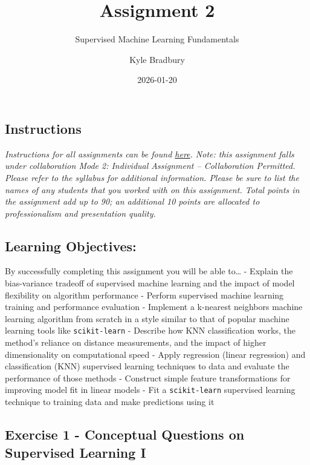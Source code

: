 \documentclass[
  letterpaper,
  DIV=11,
  numbers=noendperiod]{scrartcl}
\title{Assignment 2}
\subtitle{Supervised Machine Learning Fundamentals}
\author{Kyle Bradbury}
\date{2026-01-20}
\renewcommand*\contentsname{Table of contents}
\newcommand\contentsname{Table of contents}
\begin{document}
\maketitle

\renewcommand*\contentsname{Table of contents}
{
\hypersetup{linkcolor=}
\setcounter{tocdepth}{1}
\tableofcontents
}

\subsection{Instructions}\label{instructions}

\emph{Instructions for all assignments can be found
\href{https://kylebradbury.github.io/ids705/notebooks/assignment_instructions.html}{here}.
Note: this assignment falls under collaboration Mode 2: Individual
Assignment -- Collaboration Permitted. Please refer to the syllabus for
additional information. Please be sure to list the names of any students
that you worked with on this assignment. Total points in the assignment
add up to 90; an additional 10 points are allocated to professionalism
and presentation quality.}

\subsection{Learning Objectives:}\label{learning-objectives}

By successfully completing this assignment you will be able to\ldots{} -
Explain the bias-variance tradeoff of supervised machine learning and
the impact of model flexibility on algorithm performance - Perform
supervised machine learning training and performance evaluation -
Implement a k-nearest neighbors machine learning algorithm from scratch
in a style similar to that of popular machine learning tools like
\texttt{scikit-learn} - Describe how KNN classification works, the
method's reliance on distance measurements, and the impact of higher
dimensionality on computational speed - Apply regression (linear
regression) and classification (KNN) supervised learning techniques to
data and evaluate the performance of those methods - Construct simple
feature transformations for improving model fit in linear models - Fit a
\texttt{scikit-learn} supervised learning technique to training data and
make predictions using it

\subsection{Exercise 1 - Conceptual Questions on Supervised Learning
I}\label{exercise-1---conceptual-questions-on-supervised-learning-i}
\end{document}
